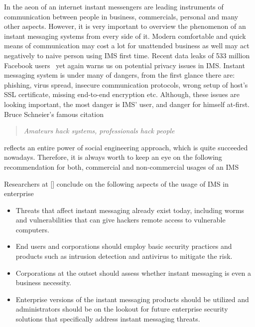 %

In the aeon of an internet instant messengers are leading instruments of communication between people in business,
commercials, personal and many other aspects.
However, it is very important to overview the phenomenon of an instant messaging systems from every side of it.
Modern comfortable and quick means of communication may cost a lot for unattended business as well may act negatively to
naive person using IMS first time.
Recent data leaks of 533 million Facebook users~\cite{holmes2021533} yet again warns us on potential privacy issues in IMS\@.
Instant messaging system is under many of dangers, from the first glance there are: phishing, virus spread,
insecure communication protocols, wrong setup of host's SSL certificate, missing end-to-end encryption etc.
Although, these issues are looking important, the most danger is IMS' user, and danger for himself at-first.
Bruce Schneier's famous citation
\begin{quote}
    \textit{Amateurs hack systems, professionals hack people}
\end{quote}
reflects an entire power of social engineering approach, which is quite succeeded nowadays.
Therefore, it is always worth to keep an eye on the following recommendation for both, commercial and non-commercial
usages of an IMS

Researchers at [\cite{hindocha2003malicious}] conclude on the following aspects of the usage of IMS in enterprise

\begin{itemize}
    \item Threats that affect instant messaging already exist today, including worms and vulnerabilities that can
    give hackers remote access to vulnerable computers.
    \item End users and corporations should employ basic security practices and products such as
    intrusion detection and antivirus to mitigate the risk.
    \item Corporations at the outset should assess whether instant messaging is even a business necessity.
    \item Enterprise versions of
    the instant messaging products should be utilized and administrators should be on the lookout for
    future enterprise security solutions that specifically address instant messaging threats.
\end{itemize}